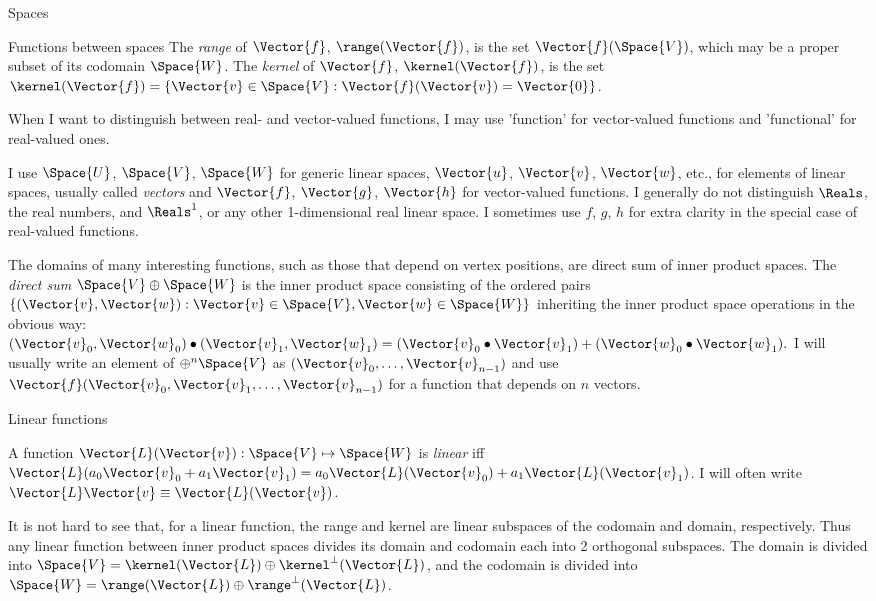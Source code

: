 \begin{plSection}{Spaces}
\begin{plSection}{Functions between spaces}
The \textit{range} of $\Vector{f}$, $\range(\Vector{f})$, is the set $\Vector{f}(\Space{V})$,
which may be a proper subset of its codomain $\Space{W}$.
The \textit{kernel} of $\Vector{f}$, $\kernel(\Vector{f})$, is the set
$\kernel(\Vector{f}) = \{ \Vector{v} \in \Space{V} : \Vector{f}(\Vector{v}) = \Vector{0} \}$.

When I want to distinguish between real- and vector-valued functions,
I may use 'function' for vector-valued functions and
'functional' for real-valued ones.

I use $\Space{U}$, $\Space{V}$, $\Space{W}$ for generic linear spaces,
$\Vector{u}$, $\Vector{v}$, $\Vector{w}$, etc., for elements of linear spaces,
usually called \textit{vectors}
and
$\Vector{f}$, $\Vector{g}$, $\Vector{h}$ for vector-valued functions.
I generally do not distinguish $\Reals$, the real numbers,
and $\Reals^1$, or any other 1-dimensional real linear space.
I sometimes use $f$, $g$, $h$ for extra clarity in the special
case of real-valued functions.

The domains of many interesting functions,
such as those that depend on vertex positions,
are direct sum of inner product spaces.
The \textit{direct sum} $\Space{V} \oplus \Space{W}$ is the inner product space
consisting of the ordered pairs 
$\{ (\Vector{v},\Vector{w}) : 
\Vector{v} \in \Space{V}, \Vector{w} \in \Space{W} \}$
inheriting the inner product space operations in the obvious way:
$(\Vector{v}_0,\Vector{w}_0) \bullet (\Vector{v}_1,\Vector{w}_1) 
= (\Vector{v}_0 \bullet \Vector{v}_1) 
+ (\Vector{w}_0 \bullet \Vector{w}_1).$
I will usually write an element of $\oplus^n \Space{V}$ as
$(\Vector{v}_0,\ldots,\Vector{v}_{n-1})$
and use
$\Vector{f}(\Vector{v}_0,\Vector{v}_1,\ldots,\Vector{v}_{n-1})$
for a function that depends on $n$ vectors.

\begin{plSection}{Linear functions}
\label{sec:linear-functions}

A function $\Vector{L}(\Vector{v}):\Space{V} \mapsto \Space{W}$
is \textit{linear} iff
$\Vector{L}(a_0 \Vector{v}_0 + a_1 \Vector{v}_1) 
= a_0 \Vector{L}(\Vector{v}_0) + a_1 \Vector{L}(\Vector{v}_1)$.
I will often write
 $\Vector{L}\Vector{v} \equiv \Vector{L}(\Vector{v})$.

It is not hard to see that, for a linear function,
the range and kernel are linear subspaces of the codomain and
domain, respectively.
Thus any linear function between inner product spaces
divides its domain and codomain each into 2 orthogonal subspaces.
The domain is divided into 
$\Space{V} = \kernel(\Vector{L}) \oplus \kernel^{\perp}(\Vector{L})$,
and the codomain is divided into 
$\Space{W} = \range(\Vector{L}) \oplus \range^{\perp}(\Vector{L})$.


\end{plSection}
\end{plSection}
\end{plSection}
